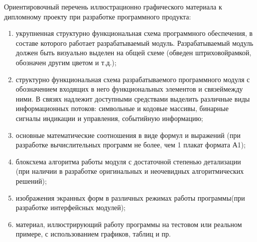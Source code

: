 Ориентировочный перечень иллюстрационно графического материала к дипломному проекту при разработке программного продукта:
\begin{enumerate}
\item  укрупненная структурно функциональная схема программного обеспечения, в составе которого работает разрабатываемый модуль. Разрабатываемый модуль должен быть визуально выделен на общей схеме (обведен штриховойрамкой, обозначен другим цветом и т.д.);
\item  структурно функциональная схема разрабатываемого программного модуля с обозначением входящих в него функциональных элементов и связеймежду ними. В связях надлежит доступными средствами выделить различные виды информационных потоков: символьные и кодовые массивы, бинарные сигналы индикации и управления, событийную информацию;
\item  основные математические соотношения в виде формул и выражений (при разработке вычислительных программ не более, чем 1 плакат формата А1);
\item  блоксхема алгоритма работы модуля с достаточной степенью детализации (при наличии в разработке оригинальных и неочевидных алгоритмических решений);
\item  изображения экранных форм в различных режимах работы программы(при разработке интерфейсных модулей);
\item  материал, иллюстрирующий работу программы на тестовом или реальном примере, с использованием графиков, таблиц и пр.
\end{enumerate}